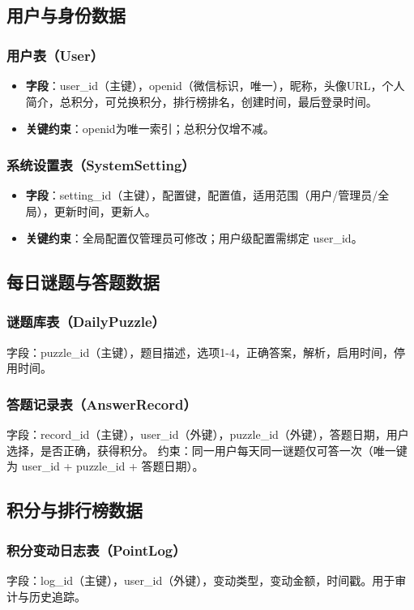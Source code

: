 \documentclass[a4paper,12pt]{article}
\begin{document}
\subsection{用户与身份数据}
\subsubsection{用户表（User）}
\begin{itemize}
    \item \textbf{字段}：user\_id（主键），openid（微信标识，唯一），昵称，头像URL，个人简介，总积分，可兑换积分，排行榜排名，创建时间，最后登录时间。
    \item \textbf{关键约束}：openid为唯一索引；总积分仅增不减。
\end{itemize}

\subsubsection{系统设置表（SystemSetting）}
\begin{itemize}
    \item \textbf{字段}：setting\_id（主键），配置键，配置值，适用范围（用户/管理员/全局），更新时间，更新人。
    \item \textbf{关键约束}：全局配置仅管理员可修改；用户级配置需绑定 user\_id。
\end{itemize}

\subsection{每日谜题与答题数据}
\subsubsection{谜题库表（DailyPuzzle）}
字段：puzzle\_id（主键），题目描述，选项1-4，正确答案，解析，启用时间，停用时间。

\subsubsection{答题记录表（AnswerRecord）}
字段：record\_id（主键），user\_id（外键），puzzle\_id（外键），答题日期，用户选择，是否正确，获得积分。
约束：同一用户每天同一谜题仅可答一次（唯一键为 user\_id + puzzle\_id + 答题日期）。

\subsection{积分与排行榜数据}
\subsubsection{积分变动日志表（PointLog）}
字段：log\_id（主键），user\_id（外键），变动类型，变动金额，时间戳。用于审计与历史追踪。
\end{document}
